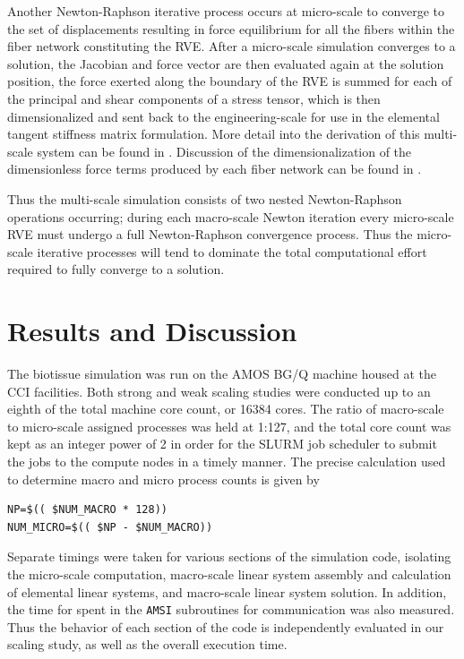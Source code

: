 \documentclass[11pt]{article}
\begin{document}
Another Newton-Raphson iterative process occurs at micro-scale to converge to the set of displacements resulting in force equilibrium for all the fibers within the fiber network constituting the RVE. After a micro-scale simulation converges to a solution, the Jacobian and force vector are then evaluated again at the solution position, the force exerted along the boundary of the RVE is summed for each of the principal and shear components of a stress tensor, which is then dimensionalized and sent back to the engineering-scale for use in the elemental tangent stiffness matrix formulation. More detail into the derivation of this multi-scale system can be found in \cite{stylianopoulos2008thesis,agoram2001coupled,stylianopoulos2007multiscale} . Discussion of the dimensionalization of the dimensionless force terms produced by each fiber network can be found in \cite{stylianopoulos2007volume,chandran2007deterministic}.

Thus the multi-scale simulation consists of two nested Newton-Raphson operations occurring; during each macro-scale Newton iteration every micro-scale RVE must undergo a full Newton-Raphson convergence process. Thus the micro-scale iterative processes will tend to dominate the total computational effort required to fully converge to a solution.

\section{Results and Discussion}\label{results}
The biotissue simulation was run on the AMOS BG/Q machine housed at the CCI facilities. Both strong and weak scaling studies were conducted up to an eighth of the total machine core count, or 16384 cores. The ratio of macro-scale to micro-scale assigned processes was held at 1:127, and the total core count was kept as an integer power of 2 in order for the SLURM job scheduler to submit the jobs to the compute nodes in a timely manner. The precise calculation used to determine macro and micro process counts is given by
%
\begin{verbatim}
NP=$(( $NUM_MACRO * 128))
NUM_MICRO=$(( $NP - $NUM_MACRO))
\end{verbatim}
\label{macro micro ratio}
%

Separate timings were taken for various sections of the simulation code, isolating the micro-scale computation, macro-scale linear system assembly and calculation of elemental linear systems, and macro-scale linear system solution. In addition, the time for spent in the \verb|AMSI| subroutines for communication was also measured. Thus the behavior of each section of the code is independently evaluated in our scaling study, as well as the overall execution time.
\end{document}
